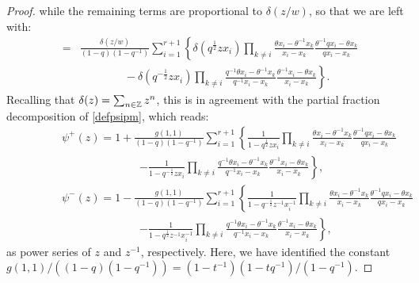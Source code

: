 \begin{proof}
while the remaining terms are proportional to $\delta(z/w)$, so that we are left
with:
\begin{eqnarray*}
[{\mathfrak e}(z),{\mathfrak f}(w)]&=&\frac{\delta(z/w)}{(1-q)(1-q^{-1})}\sum_{i=1}^{r+1}\left\{
 \delta(q^{\frac{1}{2}}z x_i)\prod_{k\neq i}\frac{\theta x_i-\theta^{-1}x_k}{x_i-x_k}\frac{\theta^{-1} q x_i-\theta x_k}{q x_i-x_k}\right.\\
&&\qquad\qquad  - \left. \delta(q^{-\frac{1}{2}}z x_i)\prod_{k\neq i}\frac{q^{-1}\theta x_i-\theta^{-1}x_k}{q^{-1}x_i-x_k}\frac{\theta^{-1} x_i-\theta x_k}{x_i-x_k}\right\}.
\end{eqnarray*}
Recalling that $\delta(z)=\sum_{n\in{\mathbb Z}} z^n$, this is in agreement with the partial fraction decomposition of \eqref{defpsipm},
which reads:
\begin{eqnarray}
&&\qquad \quad \psi^+(z)=1+\frac{g(1,1)}{(1-q)(1-q^{-1})}\sum_{i=1}^{r+1}\left\{\frac{1}{1-q^{\frac{1}{2}}z x_i}\prod_{k\neq i}\frac{\theta x_i-\theta^{-1}x_k}{x_i-x_k}\frac{\theta^{-1} q x_i-\theta x_k}{q x_i-x_k}\right. \label{psiplusX}\\
&&\qquad\qquad\qquad\qquad\qquad \left. - \frac{1}{1-q^{-\frac{1}{2}}z x_i}\prod_{k\neq i}\frac{q^{-1}\theta x_i-\theta^{-1}x_k}{q^{-1}x_i-x_k}\frac{\theta^{-1} x_i-\theta x_k}{x_i-x_k}\right\}\nonumber  ,\\
&&\qquad \quad  \psi^-(z)=1-\frac{g(1,1)}{(1-q)(1-q^{-1})}\sum_{i=1}^{r+1}\left\{\frac{1}{1-q^{-\frac{1}{2}}z^{-1} x_i^{-1}}\prod_{k\neq i}\frac{\theta x_i-\theta^{-1}x_k}{x_i-x_k}\frac{\theta^{-1} q x_i-\theta x_k}{q x_i-x_k}\right.\label{psiminusX}\\
&&\qquad\qquad\qquad\qquad\qquad \left. - \frac{1}{1-q^{\frac{1}{2}}z^{-1} x_i^{-1}}\prod_{k\neq i}\frac{q^{-1}\theta x_i-\theta^{-1}x_k}{q^{-1}x_i-x_k}\frac{\theta^{-1} x_i-\theta x_k}{x_i-x_k}\right\}\nonumber ,
\end{eqnarray}
as power series of $z$ and $z^{-1}$, respectively. Here, we have identified the constant
$g(1,1)/((1-q)(1-q^{-1}))=(1-t^{-1})(1-t q^{-1})/(1-q^{-1})$.
\end{proof}


